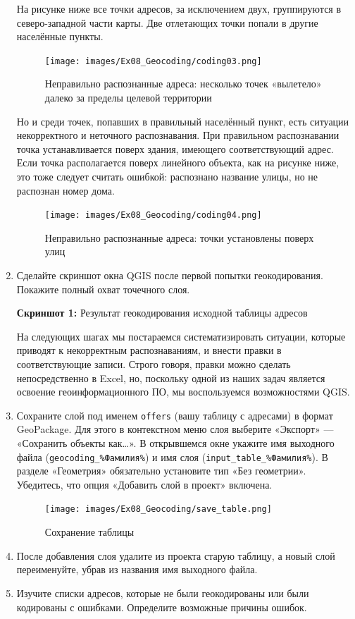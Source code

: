 \documentclass[
  12pt,
]{book}
\begin{document}
\begin{enumerate}
  На рисунке ниже все точки адресов, за исключением двух, группируются в северо-западной части карты. Две отлетающих точки попали в другие населённые пункты.

  \begin{figure}
  \centering
  \texttt{[image: images/Ex08\_Geocoding/coding03.png]}
  \caption{Неправильно распознанные адреса: несколько точек «вылетело» далеко за пределы целевой территории}
  \end{figure}

  Но и среди точек, попавших в правильный населённый пункт, есть ситуации некорректного и неточного распознавания. При правильном распознавании точка устанавливается поверх здания, имеющего соответствующий адрес. Если точка располагается поверх линейного объекта, как на рисунке ниже, это тоже следует считать ошибкой: распознано название улицы, но не распознан номер дома.

  \begin{figure}
  \centering
  \texttt{[image: images/Ex08\_Geocoding/coding04.png]}
  \caption{Неправильно распознанные адреса: точки установлены поверх улиц}
  \end{figure}
\item
  Сделайте скриншот окна QGIS после первой попытки геокодирования. Покажите полный охват точечного слоя.

  \textbf{Скриншот 1:} Результат геокодирования исходной таблицы адресов

  На следующих шагах мы постараемся систематизировать ситуации, которые приводят к некорректным распознаваниям, и внести правки в соответствующие записи. Строго говоря, правки можно сделать непосредственно в Excel, но, поскольку одной из наших задач является освоение геоинформационного ПО, мы воспользуемся возможностями QGIS.
\item
  Сохраните слой под именем \texttt{offers} (вашу таблицу с адресами) в формат GeoPackage. Для этого в контекстном меню слоя выберите «Экспорт» --- «Сохранить объекты как\ldots». В открывшемся окне укажите имя выходного файла (\texttt{geocoding\_\%Фамилия\%}) и имя слоя (\texttt{input\_table\_\%Фамилия\%}). В разделе «Геометрия» обязательно установите тип «Без геометрии». Убедитесь, что опция «Добавить слой в проект» включена.

  \begin{figure}
  \centering
  \texttt{[image: images/Ex08\_Geocoding/save\_table.png]}
  \caption{Сохранение таблицы}
  \end{figure}
\item
  После добавления слоя удалите из проекта старую таблицу, а новый слой переименуйте, убрав из названия имя выходного файла.
\item
  Изучите списки адресов, которые не были геокодированы или были кодированы с ошибками. Определите возможные причины ошибок.


\end{enumerate}
\end{document}
